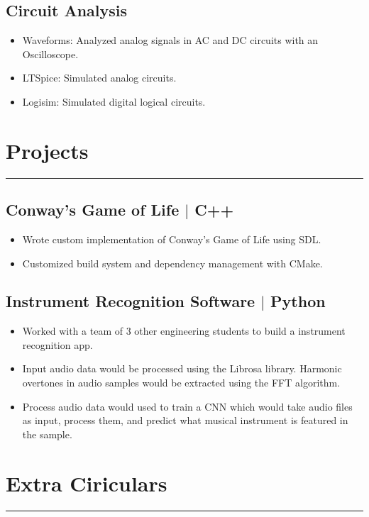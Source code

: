 \documentclass[10pt, letterpaper]{article}
\begin{document}
\subsection*{Circuit Analysis}
\begin{itemize}[noitemsep]
	\item Waveforms: Analyzed analog signals in AC and DC circuits with an Oscilloscope.	
	\item LTSpice: Simulated analog circuits.
	\item Logisim: Simulated digital logical circuits.
\end{itemize}

\section*{Projects}
\hrule
\vspace{7pt}

\subsection*{Conway's Game of Life $\vert$ C++}
\begin{itemize}[noitemsep]
	\item Wrote custom implementation of Conway's Game of Life using SDL.
	\item Customized build system and dependency management with CMake.
\end{itemize}

\subsection*{Instrument Recognition Software $\vert$ Python}
\begin{itemize}[noitemsep]
	\item Worked with a team of 3 other engineering students to build a instrument recognition app.
	\item Input audio data would be processed using the Librosa library. Harmonic overtones in audio samples would be extracted using the FFT algorithm.
	\item Process audio data would used to train a CNN which would take audio files as input, process them,
	and predict what musical instrument is featured in the sample.
\end{itemize}

\section*{Extra Ciriculars}
\hrule
\vspace{7pt}
\end{document}
